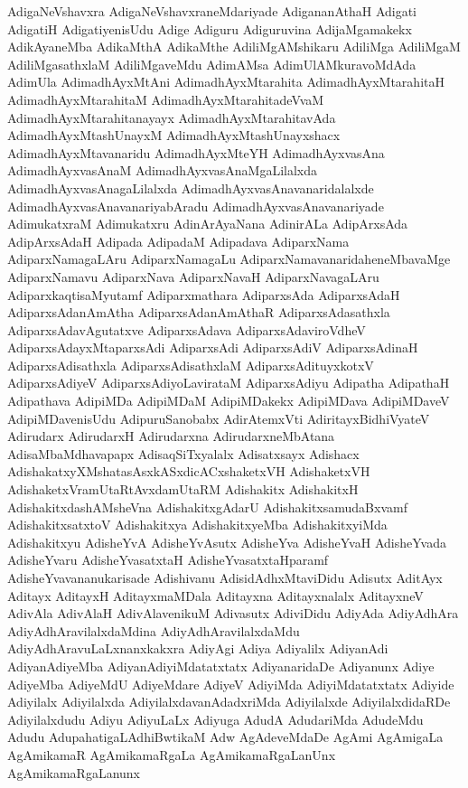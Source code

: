 {AdigaNeVshavxra
AdigaNeVshavxraneMdariyade
AdigananAthaH
Adigati
AdigatiH
AdigatiyenisUdu
Adige
Adiguru
Adiguruvina
AdijaMgamakekx
AdikAyaneMba
AdikaMthA
AdikaMthe
AdiliMgAMshikaru
AdiliMga
AdiliMgaM
AdiliMgasathxlaM
AdiliMgaveMdu
AdimAMsa
AdimUlAMkuravoMdAda
AdimUla
AdimadhAyxMtAni
AdimadhAyxMtarahita
AdimadhAyxMtarahitaH
AdimadhAyxMtarahitaM
AdimadhAyxMtarahitadeVvaM
AdimadhAyxMtarahitanayayx
AdimadhAyxMtarahitavAda
AdimadhAyxMtashUnayxM
AdimadhAyxMtashUnayxshacx
AdimadhAyxMtavanaridu
AdimadhAyxMteYH
AdimadhAyxvasAna
AdimadhAyxvasAnaM
AdimadhAyxvasAnaMgaLilalxda
AdimadhAyxvasAnagaLilalxda
AdimadhAyxvasAnavanaridalalxde
AdimadhAyxvasAnavanariyabAradu
AdimadhAyxvasAnavanariyade
AdimukatxraM
Adimukatxru
AdinArAyaNana
AdinirALa
AdipArxsAda
AdipArxsAdaH
Adipada
AdipadaM
Adipadava
AdiparxNama
AdiparxNamagaLAru
AdiparxNamagaLu
AdiparxNamavanaridaheneMbavaMge
AdiparxNamavu
AdiparxNava
AdiparxNavaH
AdiparxNavagaLAru
AdiparxkaqtisaMyutamf
Adiparxmathara
AdiparxsAda
AdiparxsAdaH
AdiparxsAdanAmAtha
AdiparxsAdanAmAthaR
AdiparxsAdasathxla
AdiparxsAdavAgutatxve
AdiparxsAdava
AdiparxsAdaviroVdheV
AdiparxsAdayxMtaparxsAdi
AdiparxsAdi
AdiparxsAdiV
AdiparxsAdinaH
AdiparxsAdisathxla
AdiparxsAdisathxlaM
AdiparxsAdituyxkotxV
AdiparxsAdiyeV
AdiparxsAdiyoLavirataM
AdiparxsAdiyu
Adipatha
AdipathaH
Adipathava
AdipiMDa
AdipiMDaM
AdipiMDakekx
AdipiMDava
AdipiMDaveV
AdipiMDavenisUdu
AdipuruSanobabx
AdirAtemxVti
AdiritayxBidhiVyateV
Adirudarx
AdirudarxH
Adirudarxna
AdirudarxneMbAtana
AdisaMbaMdhavapapx
AdisaqSiTxyalalx
Adisatxsayx
Adishacx
AdishakatxyXMshatasAsxkASxdicACxshaketxVH
AdishaketxVH
AdishaketxVramUtaRtAvxdamUtaRM
Adishakitx
AdishakitxH
AdishakitxdashAMsheVna
AdishakitxgAdarU
AdishakitxsamudaBxvamf
AdishakitxsatxtoV
Adishakitxya
AdishakitxyeMba
AdishakitxyiMda
Adishakitxyu
AdisheYvA
AdisheYvAsutx
AdisheYva
AdisheYvaH
AdisheYvada
AdisheYvaru
AdisheYvasatxtaH
AdisheYvasatxtaHparamf
AdisheYvavananukarisade
Adishivanu
AdisidAdhxMtaviDidu
Adisutx
AditAyx
Aditayx
AditayxH
AditayxmaMDala
Aditayxna
Aditayxnalalx
AditayxneV
AdivAla
AdivAlaH
AdivAlavenikuM
Adivasutx
AdiviDidu
AdiyAda
AdiyAdhAra
AdiyAdhAravilalxdaMdina
AdiyAdhAravilalxdaMdu
AdiyAdhAravuLaLxnanxkakxra
AdiyAgi
Adiya
Adiyalilx
AdiyanAdi
AdiyanAdiyeMba
AdiyanAdiyiMdatatxtatx
AdiyanaridaDe
Adiyanunx
Adiye
AdiyeMba
AdiyeMdU
AdiyeMdare
AdiyeV
AdiyiMda
AdiyiMdatatxtatx
Adiyide
Adiyilalx
Adiyilalxda
AdiyilalxdavanAdadxriMda
Adiyilalxde
AdiyilalxdidaRDe
Adiyilalxdudu
Adiyu
AdiyuLaLx
Adiyuga
AdudA
AdudariMda
AdudeMdu
Adudu
AdupahatigaLAdhiBwtikaM
Adw
AgAdeveMdaDe
AgAmi
AgAmigaLa
AgAmikamaR
AgAmikamaRgaLa
AgAmikamaRgaLanUnx
AgAmikamaRgaLanunx
}
